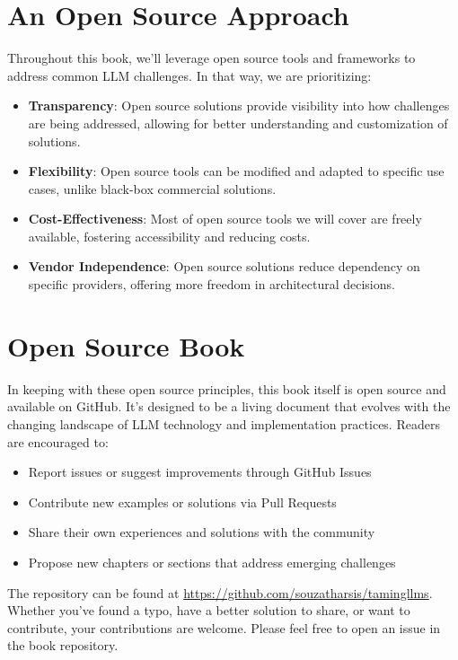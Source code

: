 \section{An Open Source Approach}

Throughout this book, we'll leverage open source tools and frameworks to address common LLM challenges. In that way, we are prioritizing:

\begin{itemize}
    \item \textbf{Transparency}: Open source solutions provide visibility into how challenges are being addressed, allowing for better understanding and customization of solutions.
    \item \textbf{Flexibility}: Open source tools can be modified and adapted to specific use cases, unlike black-box commercial solutions.
    \item \textbf{Cost-Effectiveness}: Most of open source tools we will cover are freely available, fostering accessibility and reducing costs.
    \item \textbf{Vendor Independence}: Open source solutions reduce dependency on specific providers, offering more freedom in architectural decisions.
\end{itemize}

\section{Open Source Book}

In keeping with these open source principles, this book itself is open source and available on GitHub. It's designed to be a living document that evolves with the changing landscape of LLM technology and implementation practices. Readers are encouraged to:

\begin{itemize}
    \item Report issues or suggest improvements through GitHub Issues
    \item Contribute new examples or solutions via Pull Requests
    \item Share their own experiences and solutions with the community
    \item Propose new chapters or sections that address emerging challenges
\end{itemize}

The repository can be found at \url{https://github.com/souzatharsis/tamingllms}. Whether you've found a typo, have a better solution to share, or want to contribute, your contributions are welcome. Please feel free to open an issue in the book repository.

